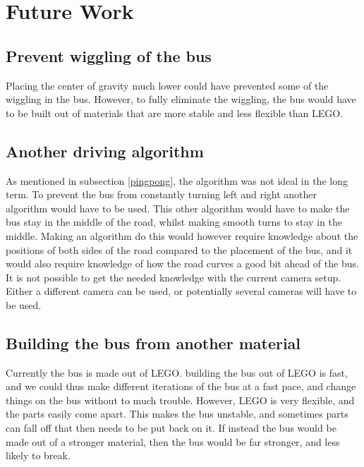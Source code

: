 \section{Future Work}

\subsection{Prevent wiggling of the bus}
 Placing the center of gravity much lower could have prevented some of the wiggling in the bus. However, to fully eliminate the wiggling, the bus would have to be built out of materials that are more stable and less flexible than LEGO.
 
 \subsection{Another driving algorithm}
 As mentioned in subsection \ref{pingpong}, the algorithm was not ideal in the long term. To prevent the bus from constantly turning left and right another algorithm would have to be used.
 This other algorithm would have to make the bus stay in the middle of the road, whilst making smooth turns to stay in the middle. Making an algorithm do this would however require knowledge about the positions of both sides of the road compared to the placement of the bus, and it would also require knowledge of how the road curves a good bit ahead of the bus. It is not possible to get the needed knowledge with the current camera setup. Either a different camera can be used, or potentially several cameras will have to be used. 
 
 \subsection{Building the bus from another material}
Currently the bus is made out of LEGO. building the bus out of LEGO is fast, and we could thus make different iterations of the bus at a fast pace, and change things on the bus without to much trouble. However, LEGO is very flexible, and the parts easily come apart. This makes the bus unstable, and sometimes parts can fall off that then needs to be put back on it. If instead the bus would be made out of a stronger material, then the bus would be far stronger, and less likely to break.
 